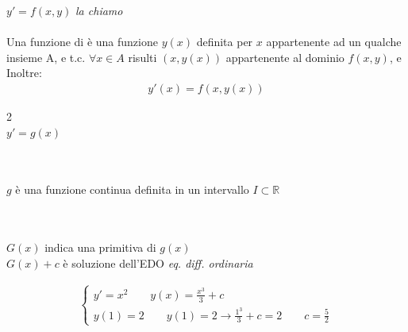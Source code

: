 \documentclass[a4paper, oneside]{article}
\newcommand{\tab}{\hspace*{2em}}
\begin{document}
$y' = f(x,y)$ \emph{la chiamo} \fbox{\textbf{*}}
\\\\
Una funzione di \fbox{\textbf{*}} è una funzione $y(x)$ definita per $x$
appartenente ad un qualche insieme A, e t.c. $\forall x \in A$
risulti $(x, y(x))$ appartenente al dominio $f(x,y)$, e Inoltre:
\begin{align}
    y'(x) = f(x,y(x))
\end{align}
\begin{example}

\begin{multicols}{2}
    \noindent
   \\\tab\tab\tab $y' = g(x)$
\columnbreak
\begin{tabbing}
\\\\$g$ è una funzione continua definita in un intervallo $I \subset \mathbb{R}$
\end{tabbing}
\end{multicols}

\end{example}


\begin{tabbing}
\\\\ $G(x)$ indica una primitiva di $g(x)$
\\\tab{} $G(x) + c$ è soluzione dell'EDO \emph{eq. diff. ordinaria}
\end{tabbing}

\begin{align}
    \begin{cases}
        y' = x^2 \qquad y(x) = \frac{x^3}{3} + c\\
        y(1) = 2 \qquad y(1) = 2 \to \frac{1^3}{3} + c = 2 \qquad c = \frac{5}{2}
    \end{cases}
\end{align}
\end{document}
